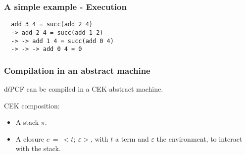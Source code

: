 \documentclass{beamer}
\begin{document}
\begin{frame}[fragile]
  \frametitle{A simple example - Execution }

\begin{verbatim}
  add 3 4 = succ(add 2 4)
  -> add 2 4 = succ(add 1 2)
  -> -> add 1 4 = succ(add 0 4)
  -> -> -> add 0 4 = 0
\end{verbatim}
\end{frame}

\begin{frame}
  \frametitle{Compilation in an abstract machine}

  d$l$PCF can be compiled in a CEK abstract machine.

  \medskip

  CEK composition:
  \begin{itemize}
  \item A stack $\pi$.
  \item A closure $c~=~<t;~\varepsilon >$, with $t$ a term and $\varepsilon$ the
    environment, to interact with the stack.
  \end{itemize}

\end{frame}
\end{document}
